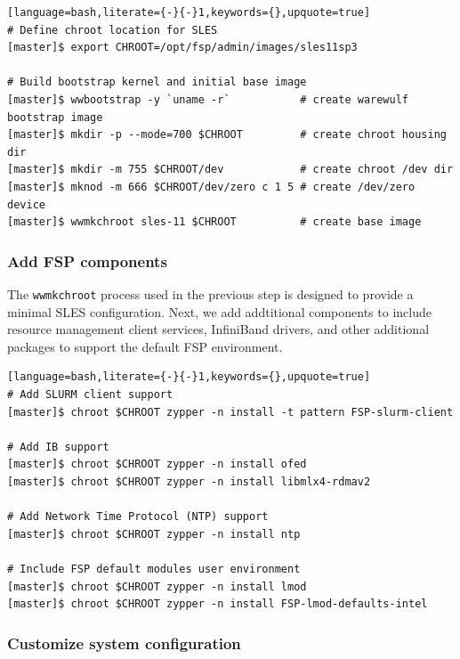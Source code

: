 \documentclass[letterpaper]{article}
\begin{document}
\begin{lstlisting}[language=bash,literate={-}{-}1,keywords={},upquote=true]
# Define chroot location for SLES 
[master]$ export CHROOT=/opt/fsp/admin/images/sles11sp3

# Build bootstrap kernel and initial base image
[master]$ wwbootstrap -y `uname -r`           # create warewulf bootstrap image
[master]$ mkdir -p --mode=700 $CHROOT         # create chroot housing dir
[master]$ mkdir -m 755 $CHROOT/dev            # create chroot /dev dir
[master]$ mknod -m 666 $CHROOT/dev/zero c 1 5 # create /dev/zero device
[master]$ wwmkchroot sles-11 $CHROOT          # create base image

\end{lstlisting}

\subsubsection{Add FSP components}

The \texttt{wwmkchroot} process used in the previous step is designed to
provide a minimal SLES configuration. Next, we add addtitional components to
include resource management client services, InfiniBand drivers, and other
additional packages to support the default FSP environment. \\

\begin{lstlisting}[language=bash,literate={-}{-}1,keywords={},upquote=true]
# Add SLURM client support
[master]$ chroot $CHROOT zypper -n install -t pattern FSP-slurm-client

# Add IB support
[master]$ chroot $CHROOT zypper -n install ofed
[master]$ chroot $CHROOT zypper -n install libmlx4-rdmav2

# Add Network Time Protocol (NTP) support
[master]$ chroot $CHROOT zypper -n install ntp

# Include FSP default modules user environment
[master]$ chroot $CHROOT zypper -n install lmod 
[master]$ chroot $CHROOT zypper -n install FSP-lmod-defaults-intel
\end{lstlisting}

\subsubsection{Customize system configuration}
\end{document}
